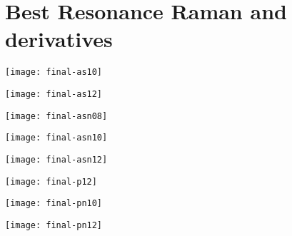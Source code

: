 \newpage
\section{Best Resonance Raman and derivatives}

\begin{figure*}[h]
    \texttt{[image: final-as10]}
    \caption[RR spectra of As10-STX at \SI{381}{\nano\metre}]{RR spectra of As10-STX at \SI{381}{\nano\metre}}
\end{figure*}
\begin{figure*}[h]
    \texttt{[image: final-as12]}
    \caption[RR spectra of As12-STX at \SI{543}{\nano\metre}]{RR spectra of As12-STX at \SI{543}{\nano\metre}}
\end{figure*}
\begin{figure*}[h]
    \texttt{[image: final-asn08]}
    \caption[RR spectra of AsN08-STX at \SI{498}{\nano\metre}]{RR spectra of AsN08-STX at \SI{498}{\nano\metre}}
\end{figure*}
\begin{figure*}[h]
    \texttt{[image: final-asn10]}
    \caption[RR spectra of AsN10-STX at \SI{618}{\nano\metre}]{RR spectra of AsN10-STX at \SI{618}{\nano\metre}}
\end{figure*}

\newpage

\begin{figure*}[h]
    \texttt{[image: final-asn12]}
    \caption[RR spectra of AsN12-STX at \SI{707}{\nano\metre}]{RR spectra of AsN12-STX at \SI{707}{\nano\metre}}
\end{figure*}
\begin{figure*}[h]
    \texttt{[image: final-p12]}
    \caption[RR spectra of P12-STX at \SI{447}{\nano\metre}]{RR spectra of P12-STX at \SI{447}{\nano\metre}}
\end{figure*}
\begin{figure*}[h]
    \texttt{[image: final-pn10]}
    \caption[RR spectra of PN10-STX at \SI{525}{\nano\metre}]{RR spectra of PN10-STX at \SI{525}{\nano\metre}}
\end{figure*}
\begin{figure*}[h]
    \texttt{[image: final-pn12]}
    \caption[RR spectra of PN12-STX at \SI{616}{\nano\metre}]{RR spectra of PN12-STX at \SI{616}{\nano\metre}}
\end{figure*}
